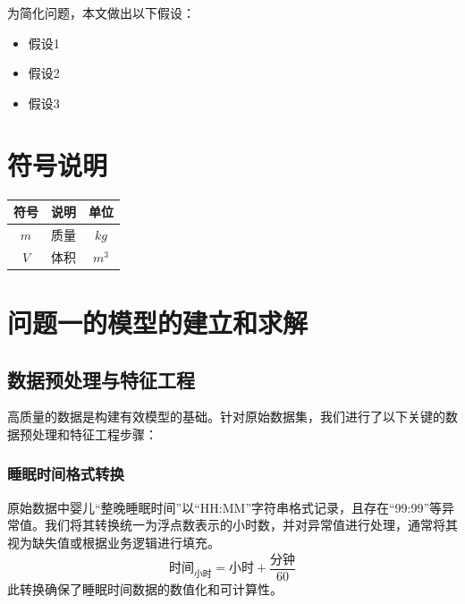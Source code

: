 \documentclass[withoutpreface,bwprint]{cumcmthesis}
\begin{document}
为简化问题，本文做出以下假设：

\begin{itemize}[itemindent=2em]
\item 假设1
\item 假设2
\item 假设3
\end{itemize}


\section{符号说明}
\begin{table}[H]
\centering
\begin{tabularx}{\textwidth}{CLC}
\toprule
符号    & 说明    & 单位 \\
\midrule
$m     $& 质量 & $kg$ \\
$V     $& 体积 & $m^3$ \\
\bottomrule
\end{tabularx}
\label{tab:符号说明}
\end{table}



\section{问题一的模型的建立和求解}


\subsection{数据预处理与特征工程}
高质量的数据是构建有效模型的基础。针对原始数据集，我们进行了以下关键的数据预处理和特征工程步骤：

\subsubsection{睡眠时间格式转换}
原始数据中婴儿“整晚睡眠时间”以“HH:MM”字符串格式记录，且存在“99:99”等异常值。我们将其转换统一为浮点数表示的小时数，并对异常值进行处理，通常将其视为缺失值或根据业务逻辑进行填充。
$$ \text{时间}_{\text{小时}} = \text{小时} + \frac{\text{分钟}}{60} $$
此转换确保了睡眠时间数据的数值化和可计算性。
\end{document}
